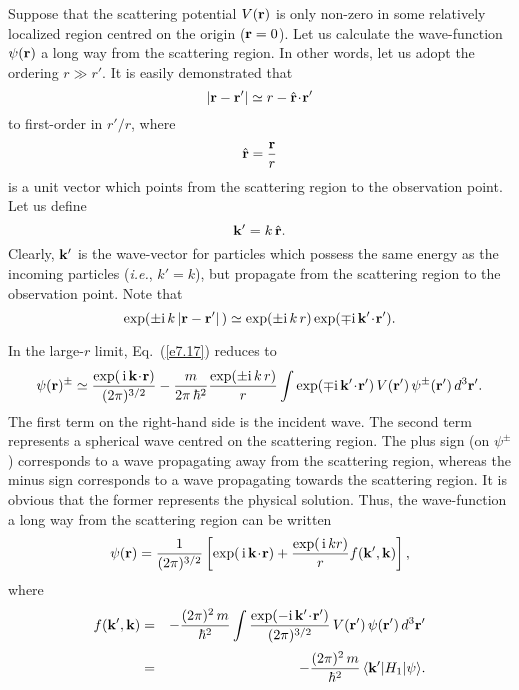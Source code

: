 Suppose that the scattering potential $V({\bf r})$ is only non-zero in some
relatively localized region centred on the origin (${\bf r} = 0$).
Let us calculate the wave-function $\psi({\bf r})$ a long way from
the scattering region. In other words, let us adopt the ordering
$r\gg r'$. It is easily demonstrated that
\begin{equation}
|{\bf r} - {\bf r}'| \simeq r - \hat{{\bf r}}\!\cdot\!{\bf r}'
\end{equation}
to first-order in $r'/r$, where
\begin{equation}
\hat{{\bf r}} = \frac{\bf r}{r}
\end{equation}
is a unit vector which points from the scattering region to the
observation point. Let us define
\begin{equation}
{\bf k}' = k\,\hat{{\bf r}}.
\end{equation}
Clearly, ${\bf k}'$ is the wave-vector for particles which possess the
same energy as the incoming particles ({\em i.e.}, $k'=k$), but propagate
from the scattering region to the observation point. Note that
\begin{equation}
\exp(\pm {\rm i}\, k\,|{\bf r} - {\bf r'} |\,) \simeq
\exp(\pm {\rm i}\, k \,r) \exp(\mp {\rm i}\, {\bf k}'\!\cdot \!{\bf r}').
\end{equation}

In the large-$r$ limit, Eq.~(\ref{e7.17}) reduces to
\begin{equation}
\psi({\bf r})^\pm \simeq \frac{\exp(\,{\rm i}\,{\bf k}\!\cdot\!{\bf r})}{
(2\pi)^{3/2}} -\frac{m}{2\pi\,\hbar^2} \frac{\exp(\pm{\rm i}\,k\,r)}{r}
\int \exp(\mp {\rm i} \,{\bf k}'\! \cdot \!{\bf r}')\,
V({\bf r}')\, \psi^\pm  ({\bf r}')\,d^3{\bf r}'.
\end{equation}
The first term on the right-hand side is the incident wave. The second term
represents a spherical wave centred on the scattering region. The
plus sign (on $\psi^\pm$) corresponds to a wave propagating away from the
scattering region, whereas the minus sign corresponds to a
wave propagating towards the scattering region. It is obvious that
the former represents the physical solution. 
Thus, the wave-function a long way from the scattering region can be
written
\begin{equation}
\psi({\bf r}) = \frac{1}{(2\pi)^{3/2}} \left[\exp(\,{\rm i}\,{\bf k}\!\cdot\!{\bf r}) + \frac{\exp(\,{\rm i}\,kr)}{r} f({\bf k}', {\bf k}) \right],
\end{equation}
where
\begin{eqnarray}
f({\bf k}', {\bf k}) &= &- \frac{(2\pi)^2 \,m}{\hbar^2} \int
\frac{\exp(-{\rm i}\,{\bf k}'\!\cdot \! {\bf r}'  ) }{(2\pi)^{3/2}}\, V({\bf r}')\,\psi({\bf r}') \,d^3{\bf r}'  \nonumber\\[0.5ex]
&=& - \frac{(2\pi)^2 \,m}{\hbar^2}\, \langle {\bf k}'|H_1|\psi\rangle.
\end{eqnarray}

